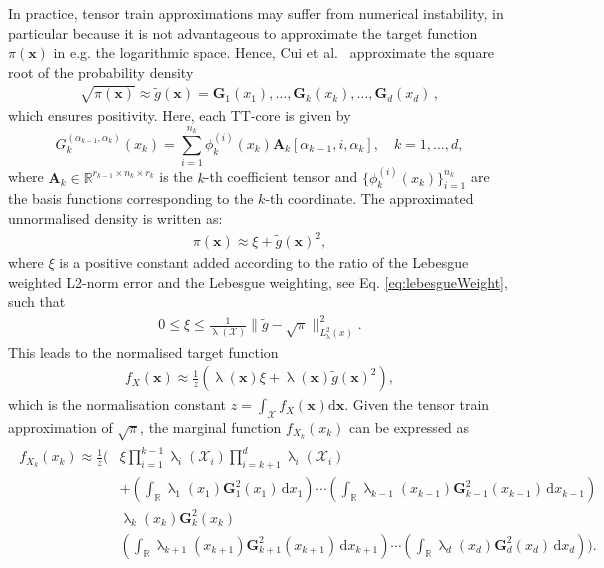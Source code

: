 In practice, tensor train approximations may suffer from numerical instability, in particular because it is not advantageous to approximate the target function $\pi(\bm{x})$ in e.g. the logarithmic space. 
Hence, Cui et al.~\cite{cui2022deep} approximate the square root of the probability density
\begin{align}
	\sqrt{\pi(\bm{x})} \approx \tilde{g}(\bm{x}) = \bm{G}_1(x_1), \dots, \bm{G}_k(x_k), \dots, \bm{G}_d(x_d)\, ,
\end{align}
which ensures positivity.
Here, each TT-core is given by
\begin{equation}
	G^{(\alpha_{k-1},\alpha_k)}_k(x_k) = \sum_{i=1}^{n_k} \phi^{(i)}_k(x_k) \bm{A}_k[\alpha_{k-1}, i, \alpha_k], \quad k = 1, \dots, d,
\end{equation}
where $\bm{A}_k \in \mathbb{R}^{r_{k-1} \times n_k \times r_k}$ is the $k$-th coefficient tensor and $\{\phi^{(i)}_k(x_k)\}_{i=1}^{n_k}$ are the basis functions corresponding to the $k$-th coordinate.
The approximated unnormalised density is written as:
\begin{align}
	\pi(\bm{x}) \approx \xi + \tilde{g}(\bm{x})^2,
\end{align}
where $\xi$ is a positive constant added according to the ratio of the Lebesgue weighted L2-norm error and the Lebesgue weighting, see Eq. \ref{eq:lebesgueWeight}, such that
\begin{align}
	0 \leq \xi \leq \frac{1}{\uplambda(\mathcal{X})} \lVert \tilde{g} - \sqrt{\pi} \rVert_{L^2_{\uplambda}(x)}^2.
\end{align}
This leads to the normalised target function
\begin{align}
	f_X(\bm{x})  \approx \frac{1}{z} \left( \uplambda(\bm{x}) \xi  + \uplambda(\bm{x}) \tilde{g}(\bm{x})^2 \right),
\end{align}
which is the normalisation constant $z = \int_{\mathcal{X}} f_X(\bm{x}) \text{d} \bm{x} $.
Given the tensor train approximation of $\sqrt{\pi}$, the marginal function $f_{X_k}(x_k)$ can be expressed as
\begin{align}
	\begin{split}
		f_{X_k}(x_k)  \approx \frac{1}{z} \Bigg(&\xi \prod_{i=1}^{k-1} \uplambda_i(\mathcal{X}_i) \prod_{i=k+1}^{d} \uplambda_i(\mathcal{X}_i) \\
		&+ \left( \int_{\mathbb{R}} \uplambda_1(x_1) \bm{G}_1^2(x_1)  \, \mathrm{d}x_1 \right) \cdots 
		\left( \int_{\mathbb{R}} \uplambda_{k-1}(x_{k-1}) \bm{G}_{k-1}^2(x_{k-1}) \, \mathrm{d}x_{k-1} \right) \\
		& \uplambda_k(x_k) \bm{G}_k^2(x_k)  \\
		&\left( \int_{\mathbb{R}} \uplambda_{k+1}(x_{k+1}) \bm{G}_{k+1}^2(x_{k+1})  \, \mathrm{d}x_{k+1} \right) \cdots 
		\left( \int_{\mathbb{R}} \uplambda_d(x_d) \bm{G}_d^2(x_d)  \, \mathrm{d}x_d \right) \Bigg).
	\end{split}
\end{align}





